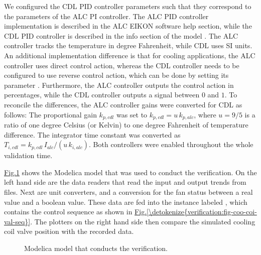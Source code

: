 \documentclass[letterpaper,10pt, openany,english]{sphinxmanual}
\let\sphinxpxdimen\pdfpxdimen\else\newdimen\sphinxpxdimen
\begin{document}
We configured the CDL PID controller parameters such that they correspond to the parameters of the
ALC PI controller. The ALC PID controller implementation is described
in the ALC EIKON software help section, while the CDL PID
controller is described in the info section of the model
.
The ALC controller tracks the temperature in
degree Fahrenheit, while CDL uses SI units.
An additional implementation difference is that for cooling applications, the ALC
controller uses direct control action, whereas the CDL controller needs to be configured to use
reverse control action, which can be done by setting its parameter .
Furthermore, the ALC controller outputs the control action in percentages, while the CDL controller outputs
a signal between \(0\) and \(1\).
To reconcile the differences, the ALC controller gains were
converted for CDL as follows:
The proportional gain \(k_{p,cdl}\) was set to
\(k_{p,cdl} = u \, k_{p,alc}\), where \(u=9/5\) is a ratio of one degree Celsius
(or Kelvin) to one degree Fahrenheit of temperature difference.
The integrator time constant was converted
as
\(T_{i,cdl} = k_{p,cdl} \, I_{alc}/(u \, k_{i,alc})\).
Both controllers were enabled throughout the whole validation time.

\hyperref[\detokenize{verification:fig-coo-coi-val-tre}]{Fig.\@ \ref{\detokenize{verification:fig-coo-coi-val-tre}}} shows the
Modelica model that was used to conduct the verification. On the left hand side
are the data readers that read the input and output
trends from files. Next are unit converters, and a conversion for the fan status
between a real value and a boolean value. These data are fed into the instance labeled
, which contains the control sequence
as shown in \hyperref[\detokenize{verification:fig-coo-coi-val-seq}]{Fig.\@ \ref{\detokenize{verification:fig-coo-coi-val-seq}}}. The plotters on the right hand side then
compare the simulated cooling coil valve position with the recorded data.

\begin{figure}[htbp]
\centering
\capstart

\noindent\sphinxincludegraphics[width=800\sphinxpxdimen]{{CoolingCoilValve_Trends}.pdf}
\caption{Modelica model that conducts the verification.}\label{\detokenize{verification:id11}}\label{\detokenize{verification:fig-coo-coi-val-tre}}\end{figure}
\end{document}
